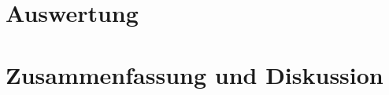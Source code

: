 \documentclass[ngerman]{scrartcl}
\begin{document}



\section{Auswertung}
\label{sec:auswertung}



\section{Zusammenfassung und Diskussion}
\label{sec:zusammenfassung_diskussion}



\label{sec:python}





\clearpage
\printbibliography

\listoffigures

\listoftables
\end{document}
